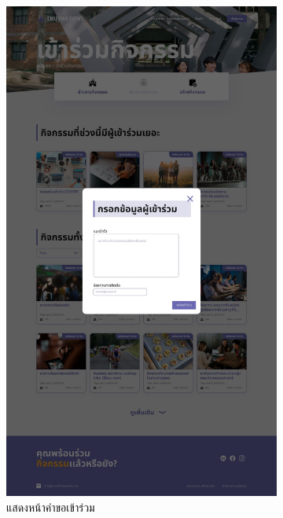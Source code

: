 \begin{figure}[h]
  \centering
  \begin{subfigure}[b]{0.3\linewidth}
    \includegraphics[width=\linewidth]{image/Figma-design/New-Event-join.jpg}
    \caption{แสดงหน้าคำขอเข้าร่วม}
  \end{subfigure}
  \hfill
  \begin{subfigure}[b]{0.3\linewidth}

\end{subfigure}
\end{figure}
